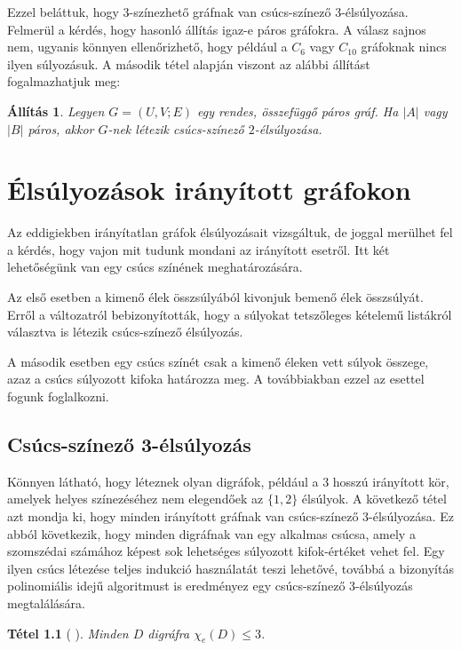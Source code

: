 \documentclass[12pt, a4paper]{report}
\newtheorem{tét}{Tétel}[section]
\newtheorem{áll}[tét]{Állítás}
\theoremstyle{remark}
\theoremstyle{definition}
\begin{document}
Ezzel beláttuk, hogy $3$-színezhető gráfnak van csúcs-színező $3$-élsúlyozása. Felmerül a kérdés, hogy hasonló állítás igaz-e páros gráfokra. A válasz sajnos nem, ugyanis könnyen ellenőrizhető, hogy például a $C_6$ vagy $C_{10}$ gráfoknak nincs ilyen súlyozásuk. A második tétel alapján viszont az alábbi állítást fogalmazhatjuk meg:

\begin{áll}
Legyen $G = (U, V; E)$ egy rendes, összefüggő páros gráf. Ha $|A|$ vagy $|B|$ páros, akkor $G$-nek létezik csúcs-színező $2$-élsúlyozása.
\end{áll}

\chapter{Élsúlyozások irányított gráfokon}
Az eddigiekben irányítatlan gráfok élsúlyozásait vizsgáltuk, de joggal merülhet fel a kérdés, hogy vajon mit tudunk mondani az irányított esetről. Itt két lehetőségünk van egy csúcs színének meghatározására. 

Az első esetben a kimenő élek összsúlyából kivonjuk bemenő élek összsúlyát. Erről a változatról \citeauthor{Bartnicki2009} \cite{Bartnicki2009} bebizonyították, hogy a súlyokat tetszőleges kételemű listákról választva is létezik csúcs-színező élsúlyozás.

A második esetben egy csúcs színét csak a kimenő éleken vett súlyok összege, azaz a csúcs súlyozott kifoka határozza meg. A továbbiakban ezzel az esettel fogunk foglalkozni.

\section{Csúcs-színező 3-élsúlyozás}
Könnyen látható, hogy léteznek olyan digráfok, például a $3$ hosszú irányított kör, amelyek helyes színezéséhez nem elegendőek az $\lbrace 1, 2 \rbrace$ élsúlyok. A következő tétel azt mondja ki, hogy minden irányított gráfnak van csúcs-színező 3-élsúlyozása. Ez abból következik, hogy minden digráfnak van egy alkalmas csúcsa, amely a szomszédai számához képest sok lehetséges súlyozott kifok-értéket vehet fel. Egy ilyen csúcs létezése teljes indukció használatát teszi lehetővé, továbbá a bizonyítás polinomiális idejű algoritmust is eredményez egy csúcs-színező 3-élsúlyozás megtalálására.

\begin{tét}[\citeauthor{Baudon2014} \cite{Baudon2014}]
Minden $D$ digráfra $\chi_e(D) \leq 3$.
\end{tét}
\end{document}
